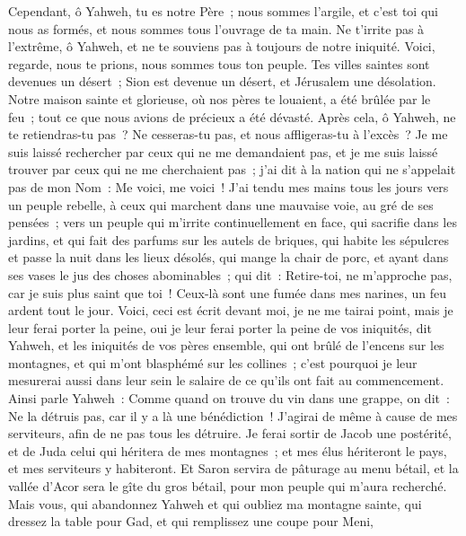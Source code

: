 \begin{multicols}{2}
Cependant, ô Yahweh, tu es notre Père~; nous sommes l'argile, et c'est toi qui nous as formés, et nous sommes tous l'ouvrage de ta main.
Ne t'irrite pas à l'extrême, ô Yahweh, et ne te souviens pas à toujours de notre iniquité. Voici, regarde, nous te prions, nous sommes tous ton peuple.
Tes villes saintes sont devenues un désert~; Sion est devenue un désert, et Jérusalem une désolation.
Notre maison sainte et glorieuse, où nos pères te louaient, a été brûlée par le feu~; tout ce que nous avions de précieux a été dévasté.
Après cela, ô Yahweh, ne te retiendras-tu pas~? Ne cesseras-tu pas, et nous affligeras-tu à l'excès~?
\VerseOne{}Je me suis laissé rechercher par ceux qui ne me demandaient pas, et je me suis laissé trouver par ceux qui ne me cherchaient pas~; j'ai dit à la nation qui ne s'appelait pas de mon Nom~: Me voici, me voici~!
J'ai tendu mes mains tous les jours vers un peuple rebelle, à ceux qui marchent dans une mauvaise voie, au gré de ses pensées~;
vers un peuple qui m'irrite continuellement en face, qui sacrifie dans les jardins, et qui fait des parfums sur les autels de briques,
qui habite les sépulcres et passe la nuit dans les lieux désolés, qui mange la chair de porc, et ayant dans ses vases le jus des choses abominables~;
qui dit~: Retire-toi, ne m'approche pas, car je suis plus saint que toi~! Ceux-là sont une fumée dans mes narines, un feu ardent tout le jour.
Voici, ceci est écrit devant moi, je ne me tairai point, mais je leur ferai porter la peine, oui je leur ferai porter la peine
de vos iniquités, dit Yahweh, et les iniquités de vos pères ensemble, qui ont brûlé de l'encens sur les montagnes, et qui m'ont blasphémé sur les collines~; c'est pourquoi je leur mesurerai aussi dans leur sein le salaire de ce qu'ils ont fait au commencement.
Ainsi parle Yahweh~: Comme quand on trouve du vin dans une grappe, on dit~: Ne la détruis pas, car il y a là une bénédiction~! J'agirai de même à cause de mes serviteurs, afin de ne pas tous les détruire.
Je ferai sortir de Jacob une postérité, et de Juda celui qui héritera de mes montagnes~; et mes élus hériteront le pays, et mes serviteurs y habiteront.
Et Saron servira de pâturage au menu bétail, et la vallée d'Acor sera le gîte du gros bétail, pour mon peuple qui m'aura recherché.
Mais vous, qui abandonnez Yahweh et qui oubliez ma montagne sainte, qui dressez la table pour Gad, et qui remplissez une coupe pour Meni,

\end{multicols}
